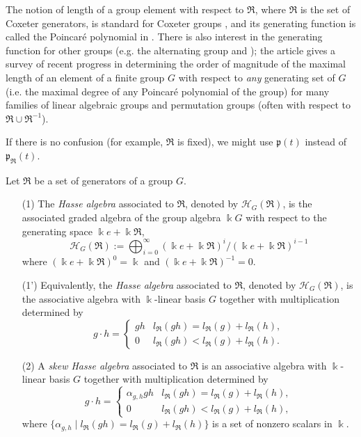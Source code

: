 The notion of length of a group element with respect to $\Re$, 
where $\Re$ is the set of Coxeter generators, is standard for 
Coxeter groups \cite[p.15]{BjB}, and its generating function 
is called the Poincar\'{e} polynomial in \cite[p. 201]{BjB}.  
There is also interest in the generating function for other groups 
(e.g. the alternating group \cite[p. 3]{Ro} and \cite[p. 849]{BRR});  
the article \cite{He} gives a survey of recent progress in determining 
the order of magnitude of the maximal length of an element of a finite 
group $G$ with respect to {\it any} generating set of $G$ 
(i.e. the maximal degree of any Poincar\'{e} polynomial of the group) 
for many families of linear algebraic groups and permutation groups 
(often with respect to $\Re  \cup \Re^{-1}$). 

If there is no confusion (for example, $\Re$ is fixed), 
we might use ${\mathfrak{p}}(t)$ instead of ${\mathfrak{p}}_\Re(t)$.

\begin{definition}
\label{xxdef2.3} Let $\Re$ be a set of generators of a group $G$.
\begin{enumerate}
\item[(1)]
The {\it Hasse algebra} associated to $\Re$, denoted
by ${\mathcal H}_G(\Re)$,  is the associated 
graded algebra of the group algebra $\Bbbk G$ with respect to the generating
space $\Bbbk e+\Bbbk \Re$,
$${\mathcal H}_G(\Re):=\bigoplus_{i=0}^{\infty} 
(\Bbbk e+\Bbbk \Re)^i/(\Bbbk e+\Bbbk \Re)^{i-1}$$
where $(\Bbbk e+\Bbbk \Re)^0=\Bbbk $ and $(\Bbbk e+\Bbbk \Re)^{-1}=0$.
\item[(1')]
Equivalently, the {\it Hasse algebra} associated to $\Re$, denoted
by ${\mathcal H}_G(\Re)$, is the
associative algebra with $\Bbbk$-linear basis $G$ together with 
multiplication determined by 
$$ g\cdot h=\begin{cases} gh & {l_{\Re}}(gh)={l_{\Re}}(g)+{l_{\Re}}(h),\\
0& {l_{\Re}}(gh)<{l_{\Re}}(g)+{l_{\Re}}(h).\end{cases}$$
\item[(2)]
A  {\it skew Hasse algebra} associated to $\Re$ is an 
associative algebra with $\Bbbk$-linear basis $G$ together with 
multiplication determined by 
$$ g\cdot h=\begin{cases} \alpha_{g,h} gh & {l_{\Re}}(gh)={l_{\Re}}(g)+{l_{\Re}}(h),\\
0& {l_{\Re}}(gh)<{l_{\Re}}(g)+{l_{\Re}}(h),\end{cases}$$
where $\{\alpha_{g,h}\mid {l_{\Re}}(gh)={l_{\Re}}(g)+{l_{\Re}}(h)\}$ is a set of 
nonzero scalars in $\Bbbk$.
\end{enumerate}
\end{definition}

